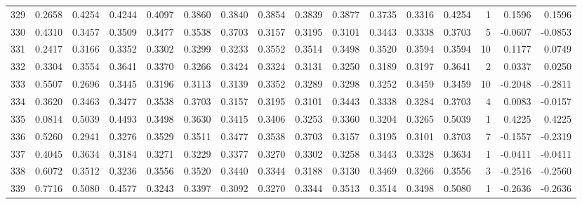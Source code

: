 \begin{tabular}{lrrrrrrrrrrrrrrr}
329 &      0.2658 &  0.4254 &  0.4244 &  0.4097 &  0.3860 &  0.3840 &  0.3854 &  0.3839 &  0.3877 &  0.3735 &   0.3316 &     0.4254 &      1 &                    0.1596 &                     0.1596 \\
330 &      0.4310 &  0.3457 &  0.3509 &  0.3477 &  0.3538 &  0.3703 &  0.3157 &  0.3195 &  0.3101 &  0.3443 &   0.3338 &     0.3703 &      5 &                   -0.0607 &                    -0.0853 \\
331 &      0.2417 &  0.3166 &  0.3352 &  0.3302 &  0.3299 &  0.3233 &  0.3552 &  0.3514 &  0.3498 &  0.3520 &   0.3594 &     0.3594 &     10 &                    0.1177 &                     0.0749 \\
332 &      0.3304 &  0.3554 &  0.3641 &  0.3370 &  0.3266 &  0.3424 &  0.3324 &  0.3131 &  0.3250 &  0.3189 &   0.3197 &     0.3641 &      2 &                    0.0337 &                     0.0250 \\
333 &      0.5507 &  0.2696 &  0.3445 &  0.3196 &  0.3113 &  0.3139 &  0.3352 &  0.3289 &  0.3298 &  0.3252 &   0.3459 &     0.3459 &     10 &                   -0.2048 &                    -0.2811 \\
334 &      0.3620 &  0.3463 &  0.3477 &  0.3538 &  0.3703 &  0.3157 &  0.3195 &  0.3101 &  0.3443 &  0.3338 &   0.3284 &     0.3703 &      4 &                    0.0083 &                    -0.0157 \\
335 &      0.0814 &  0.5039 &  0.4493 &  0.3498 &  0.3630 &  0.3415 &  0.3406 &  0.3253 &  0.3360 &  0.3204 &   0.3265 &     0.5039 &      1 &                    0.4225 &                     0.4225 \\
336 &      0.5260 &  0.2941 &  0.3276 &  0.3529 &  0.3511 &  0.3477 &  0.3538 &  0.3703 &  0.3157 &  0.3195 &   0.3101 &     0.3703 &      7 &                   -0.1557 &                    -0.2319 \\
337 &      0.4045 &  0.3634 &  0.3184 &  0.3271 &  0.3229 &  0.3377 &  0.3270 &  0.3302 &  0.3258 &  0.3443 &   0.3328 &     0.3634 &      1 &                   -0.0411 &                    -0.0411 \\
338 &      0.6072 &  0.3512 &  0.3236 &  0.3556 &  0.3520 &  0.3440 &  0.3344 &  0.3188 &  0.3130 &  0.3469 &   0.3266 &     0.3556 &      3 &                   -0.2516 &                    -0.2560 \\
339 &      0.7716 &  0.5080 &  0.4577 &  0.3243 &  0.3397 &  0.3092 &  0.3270 &  0.3344 &  0.3513 &  0.3514 &   0.3498 &     0.5080 &      1 &                   -0.2636 &                    -0.2636 \\

\end{tabular}
